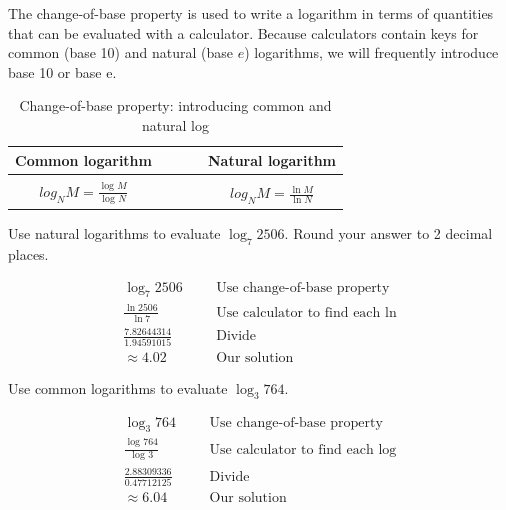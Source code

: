 The change-of-base property is used to write a logarithm in terms of quantities that can 
be evaluated with a calculator. Because calculators contain keys for common (base 10) 
and natural (base $e$) logarithms, we will frequently introduce base 10 or base e. 
	\begin{table}[H]
	\caption{Change-of-base property: introducing common and natural log}
		\centering
		\begin{tabular}{ *{5}{c}}
		    \toprule
			Common logarithm		&&&&	Natural logarithm\\
			\hline \hline\\
			$\displaystyle log_{N}M = \frac{\log_{}M}{\log_{}N}$ & &&&
			$\displaystyle log_{N}M = \frac{\ln{M}}{\ln{N}}$\\[.4cm]
			\bottomrule
		\end{tabular}
	\end{table}
\begin{exa}
Use natural logarithms to evaluate $\log_{7}2506$. Round your answer to 2 decimal places.
\end{exa}
%
\begin{align*}
	\log_{7}2506 &		&&\text{Use change-of-base property}\\
	\frac{\ln{2506}}{\ln{7}}&   &&\text{Use calculator to find each ln}\\[.2cm]
	\frac{7.82644314}{1.94591015}&  &&\text{Divide} \\[.2cm]
	\approx 4.02&		&&\text{Our solution}
\end{align*}
\begin{exa}
Use common logarithms to evaluate $\log_{3}764$.
\end{exa}
%
\begin{align*}
	\log_{3}764 &		&&\text{Use change-of-base property}\\
	\frac{\log_{}{764}}{\log_{}{3}}&   &&\text{Use calculator to find each log}\\[.2cm]
	\frac{2.88309336}{0.47712125}&  &&\text{Divide} \\[0.2cm]
	\approx 6.04&		&&\text{Our solution}
\end{align*}